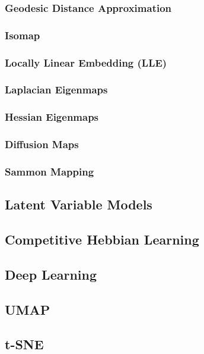 \subsubsection{Geodesic Distance Approximation}

\subsubsection{Isomap}

\subsubsection{Locally Linear Embedding (LLE)}

\subsubsection{Laplacian Eigenmaps}

\subsubsection{Hessian Eigenmaps}

\subsubsection{Diffusion Maps}

\subsubsection{Sammon Mapping}

\subsection{Latent Variable Models}

\subsection{Competitive Hebbian Learning}

\subsection{Deep Learning}


\subsection{UMAP}

\subsection{t-SNE}

